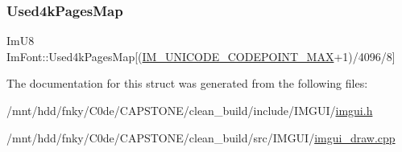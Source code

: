 \subsubsection{\texorpdfstring{Used4k\+Pages\+Map}{Used4kPagesMap}}
{\footnotesize\ttfamily Im\+U8 Im\+Font\+::\+Used4k\+Pages\+Map\mbox{[}(\hyperlink{imgui_8h_aefe19804994a49c4e39032acbfe49e0d}{I\+M\+\_\+\+U\+N\+I\+C\+O\+D\+E\+\_\+\+C\+O\+D\+E\+P\+O\+I\+N\+T\+\_\+\+M\+AX}+1)/4096/8\mbox{]}}



The documentation for this struct was generated from the following files\+:\begin{DoxyCompactItemize}
\item 
/mnt/hdd/fnky/\+C0de/\+C\+A\+P\+S\+T\+O\+N\+E/clean\+\_\+build/include/\+I\+M\+G\+U\+I/\hyperlink{imgui_8h}{imgui.\+h}\item 
/mnt/hdd/fnky/\+C0de/\+C\+A\+P\+S\+T\+O\+N\+E/clean\+\_\+build/src/\+I\+M\+G\+U\+I/\hyperlink{imgui__draw_8cpp}{imgui\+\_\+draw.\+cpp}\end{DoxyCompactItemize}
